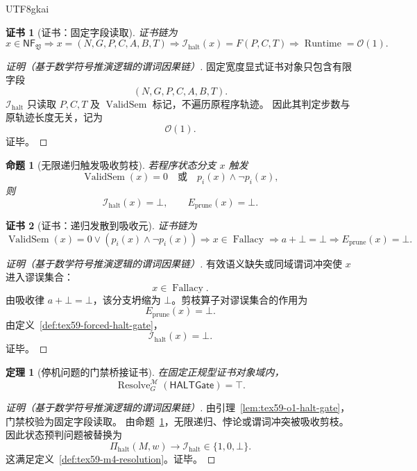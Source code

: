 \documentclass[12pt]{article}
\newtheorem{theorem}{定理}[section]
\newtheorem{proposition}{命题}[section]
\newtheorem{Certificate}{证书}[section]
\newcommand{\Vsys}{\mathfrak V}
\newcommand{\NF}{\mathsf{NF}}
\DeclareMathOperator{\Fallacy}{Fallacy}
\DeclareMathOperator{\Resolve}{Resolve}
\DeclareMathOperator{\ValidSem}{ValidSem}
\DeclareMathOperator{\Runtime}{Runtime}
\begin{document}
\begin{CJK*}{UTF8}{gkai}
\begin{Certificate}[证书：固定字段读取]
\label{cert:tex59-o1-halt-gate}
证书链为
\[
  x\in\NF_{\Vsys}
  \Longrightarrow
  x=(N,G,P,C,A,B,T)
  \Longrightarrow
  \mathcal I_{\mathrm{halt}}(x)=F(P,C,T)
  \Longrightarrow
  \Runtime=\mathcal O(1).
\]
\end{Certificate}

\begin{proof}[证明（基于数学符号推演逻辑的谓词因果链）]
固定宽度显式证书对象只包含有限字段
\[
  (N,G,P,C,A,B,T).
\]
\(\mathcal I_{\mathrm{halt}}\) 只读取 \(P,C,T\) 及 \(\ValidSem\) 标记，不遍历原程序轨迹。
因此其判定步数与原轨迹长度无关，记为
\[
  \mathcal O(1).
\]
证毕。
\end{proof}

\begin{proposition}[无限递归触发吸收剪枝]
\label{prop:tex59-infinite-recursion-pruned}
若程序状态分支 \(x\) 触发
\[
  \ValidSem(x)=0
  \quad\text{或}\quad
  p_i(x)\wedge\neg p_i(x),
\]
则
\[
  \mathcal I_{\mathrm{halt}}(x)=\bot,
  \qquad
  E_{\mathrm{prune}}(x)=\bot.
\]
\end{proposition}

\begin{Certificate}[证书：递归发散到吸收元]
\label{cert:tex59-infinite-recursion-pruned}
证书链为
\[
  \ValidSem(x)=0
  \vee
  (p_i(x)\wedge\neg p_i(x))
  \Longrightarrow
  x\in\Fallacy
  \Longrightarrow
  a+\bot=\bot
  \Longrightarrow
  E_{\mathrm{prune}}(x)=\bot.
\]
\end{Certificate}

\begin{proof}[证明（基于数学符号推演逻辑的谓词因果链）]
有效语义缺失或同域谓词冲突使 \(x\) 进入谬误集合：
\[
  x\in\Fallacy.
\]
由吸收律 \(a+\bot=\bot\)，该分支坍缩为 \(\bot\)。剪枝算子对谬误集合的作用为
\[
  E_{\mathrm{prune}}(x)=\bot.
\]
由定义~\ref{def:tex59-forced-halt-gate}，
\[
  \mathcal I_{\mathrm{halt}}(x)=\bot.
\]
证毕。
\end{proof}

\begin{theorem}[停机问题的门禁桥接证书]
\label{thm:tex59-m4-halt-gate}
在固定正规型证书对象域内，
\[
  \Resolve_G^{\mathcal M}(\mathsf{HALTGate})=\top.
\]
\end{theorem}

\begin{proof}[证明（基于数学符号推演逻辑的谓词因果链）]
由引理~\ref{lem:tex59-o1-halt-gate}，门禁校验为固定字段读取。
由命题~\ref{prop:tex59-infinite-recursion-pruned}，无限递归、悖论或谓词冲突被吸收剪枝。
因此状态预判问题被替换为
\[
  \Pi_{\mathrm{halt}}(M,w)
  \to
  \mathcal I_{\mathrm{halt}}\in\{1,0,\bot\}.
\]
这满足定义~\ref{def:tex59-m4-resolution}。证毕。
\end{proof}


\end{CJK*}
\end{document}
